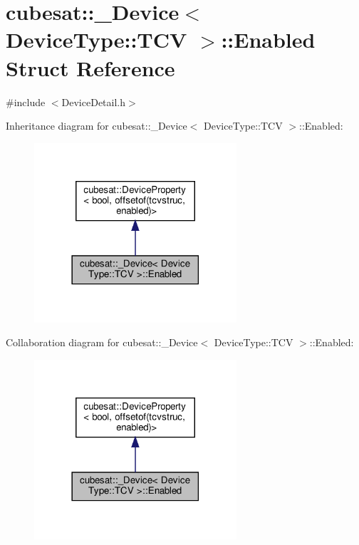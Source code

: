 \hypertarget{structcubesat_1_1__Device_3_01DeviceType_1_1TCV_01_4_1_1Enabled}{}\section{cubesat\+:\+:\+\_\+\+Device$<$ Device\+Type\+:\+:T\+CV $>$\+:\+:Enabled Struct Reference}
\label{structcubesat_1_1__Device_3_01DeviceType_1_1TCV_01_4_1_1Enabled}


{\ttfamily \#include $<$Device\+Detail.\+h$>$}



Inheritance diagram for cubesat\+:\+:\+\_\+\+Device$<$ Device\+Type\+:\+:T\+CV $>$\+:\+:Enabled\+:\nopagebreak
\begin{figure}[H]
\begin{center}
\leavevmode
\includegraphics[width=213pt]{structcubesat_1_1__Device_3_01DeviceType_1_1TCV_01_4_1_1Enabled__inherit__graph}
\end{center}
\end{figure}


Collaboration diagram for cubesat\+:\+:\+\_\+\+Device$<$ Device\+Type\+:\+:T\+CV $>$\+:\+:Enabled\+:\nopagebreak
\begin{figure}[H]
\begin{center}
\leavevmode
\includegraphics[width=213pt]{structcubesat_1_1__Device_3_01DeviceType_1_1TCV_01_4_1_1Enabled__coll__graph}
\end{center}
\end{figure}

